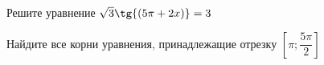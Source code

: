 \begin{ex}
	\begin{condition}
		\begin{enumcols}[label=\asbuk*)]
			\item Решите уравнение \( \sqrt{3}\tg{(5\pi + 2x)} = 3 \)
			\item Найдите все корни уравнения, принадлежащие отрезку \( \left[\pi;\dfrac{5\pi}{2}\right]  \)
		\end{enumcols}
	\end{condition}
\end{ex}